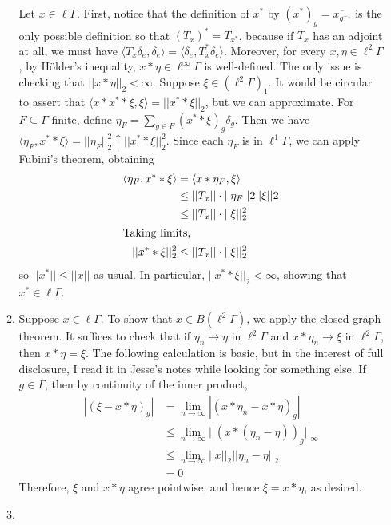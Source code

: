 \documentclass[a4paper,10pt]{report}
\newcommand{\ggen}[1]{\langle#1\rangle}
\newcommand{\pn}[2]{||#1||_{#2}}
\newcommand{\norm}[1]{||#1||}
\newcommand{\ol}[1]{\overline{#1}}
\begin{document}
\begin{enumerate}
\begin{enumerate}
				Let $x\in\ell\Gamma$. First, notice that the definition of $x^*$ by $(x^*)_g=\ol{x_{g^{-1}}}$ is the only possible definition so that $(T_x)^*=T_{x^*}$, because if $T_x$ has an adjoint at all, we must have $\ggen{T_x\delta_e,\delta_e}=\ggen{\delta_e,T_x^*\delta_e}$. Moreover, for every $x,\eta\in\ell^2\Gamma$, by {H\"{o}lder's} inequality, $x\ast\eta\in\ell^\infty\Gamma$ is well-defined. The only issue is checking that $\pn{x\ast\eta}{2}<\infty$. Suppose $\xi\in(\ell^2\Gamma)_1$. %
				It would be circular to assert that $\ggen{x\ast x^*\ast\xi,\xi}=\pn{x^*\ast\xi}{2}$, but we can approximate. For $F\subseteq\Gamma$ finite, define $\eta_F=\sum_{g\in F}(x^*\ast\xi)_g\delta_g$. Then we have $\ggen{\eta_F,x^*\ast\xi}=\pn{\eta_F}{2}^2\uparrow\pn{x^*\ast\xi}{2}^2$. Since each $\eta_F$ is in $\ell^1\Gamma$, we can apply Fubini's theorem, obtaining 
				\begin{align*}
					\ggen{\eta_F,x^*\ast\xi} &= \ggen{x\ast\eta_F,\xi}\\
					&\le \norm{T_x}\cdot\norm{\eta_F}{2}\norm{\xi}{2}\\
					&\le \norm{T_x}\cdot\pn{\xi}{2}^2\\
					\intertext{Taking limits, }
					\pn{x^*\ast\xi}{2}^2 &\le \norm{T_x}\cdot\pn{\xi}{2}^2
				\end{align*}
				so $\norm{x^*}\le\norm{x}$ as usual. In particular, $\pn{x^*\ast\xi}{2}<\infty$, showing that $x^*\in\ell\Gamma$. 
			\item Suppose $x\in\ell\Gamma$. To show that $x\in B(\ell^2\Gamma)$, we apply the closed graph theorem. It suffices to check that if $\eta_n\to\eta$ in $\ell^2\Gamma$ and $x\ast\eta_n\to\xi$ in $\ell^2\Gamma$, then $x\ast\eta=\xi$. The following calculation is basic, but in the interest of full disclosure, I read it in Jesse's notes while looking for something else. If $g\in\Gamma$, then by continuity of the inner product, 
				\begin{align*}
					|(\xi-x\ast\eta)_g| &= \lim_{n\to\infty}|(x\ast\eta_n-x\ast\eta)_g|\\
					&\le \lim_{n\to\infty}\pn{(x\ast(\eta_n-\eta))_g}{\infty}\\
					&\le \lim_{n\to\infty}\pn{x}{2}\pn{\eta_n-\eta}{2}\\
					&= 0
				\end{align*}
				Therefore, $\xi$ and $x\ast\eta$ agree pointwise, and hence $\xi=x\ast\eta$, as desired. 
			\item 

\end{enumerate}
\end{enumerate}
\end{document}

